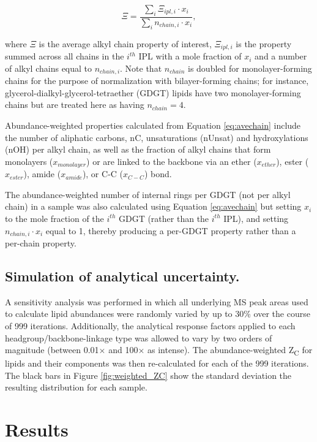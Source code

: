 \begin{equation} \label{eq:avechain}
\Xi = \frac{\sum_{i} \Xi_{ipl,i} \cdot x_{i}}{\sum_{i} n_{chain,i} \cdot x_{i}},
\end{equation}

\noindent where $\Xi$ is the average alkyl chain property of interest, $\Xi_{ipl,i}$ is the property summed across all chains in the $i^{th}$ IPL with a mole fraction of $x_{i}$ and a number of alkyl chains equal to $n_{chain,i}$. Note that $n_{chain}$ is doubled for monolayer-forming chains for the purpose of normalization with bilayer-forming chains; for instance, glycerol-dialkyl-glycerol-tetraether (GDGT) lipids have two monolayer-forming chains but are treated here as having $n_{chain} = 4$.

Abundance-weighted properties calculated from Equation \ref{eq:avechain} include the number of aliphatic carbons, nC, unsaturations (nUnsat) and hydroxylations (nOH) per alkyl chain, as well as the fraction of alkyl chains that form monolayers ($x_{monolayer}$) or are linked to the backbone via an ether ($x_{ether}$), ester ($x_{ester}$), amide ($x_{amide}$), or C-C ($x_{C-C}$) bond.

The abundance-weighted number of internal rings per GDGT (not per alkyl chain) in a sample was also calculated using Equation \ref{eq:avechain} but setting $x_{i}$ to the mole fraction of the $i^{th}$ GDGT (rather than the $i^{th}$ IPL), and setting $n_{chain,i} \cdot x_{i}$ equal to 1, thereby producing a per-GDGT property rather than a per-chain property.

\subsection{Simulation of analytical uncertainty.} A sensitivity analysis was performed in which all underlying MS peak areas used to calculate lipid abundances were randomly varied by up to 30\% over the course of 999 iterations. Additionally, the analytical response factors applied to each headgroup/backbone-linkage type was allowed to vary by two orders of magnitude (between 0.01$\times$ and 100$\times$ as intense). The abundance-weighted Z\textsubscript{C} for lipids and their components was then re-calculated for each of the 999 iterations. The black bars in Figure \ref{fig:weighted_ZC} show the standard deviation the resulting distribution for each sample.

\section{Results}
